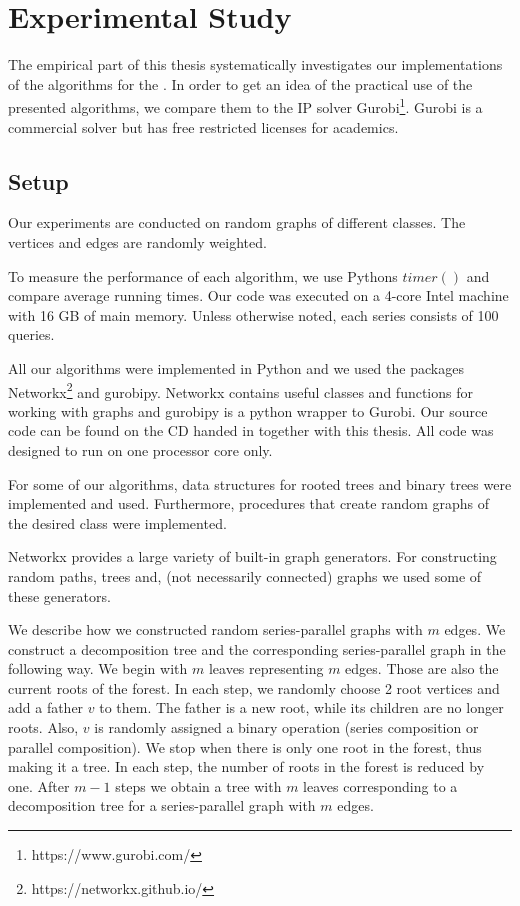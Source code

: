 \section{Experimental Study}
\label{sec:study}

The empirical part of this thesis systematically investigates our implementations of the algorithms for the \WSP. In order to get an idea of the practical use of the presented algorithms, we compare them to the IP solver Gurobi\footnote{https://www.gurobi.com/}. Gurobi is a commercial solver but has free restricted licenses for academics.


\subsection{Setup}
\label{sec:study:setup}

Our experiments are conducted on random graphs of different classes. The vertices and edges are randomly weighted.\medskip

To measure the performance of each algorithm, we use Pythons $timer()$ and compare average running times. Our code was executed on a 4-core Intel machine with 16 GB of main memory. Unless otherwise noted, each series consists of 100 queries.\medskip

All our algorithms were implemented in Python and we used the packages Networkx\footnote{https://networkx.github.io/} and gurobipy. Networkx contains useful classes and functions for working with graphs and gurobipy is a python wrapper to Gurobi. Our source code can be found on the CD handed in together with this thesis. All code was designed to run on one processor core only.\medskip

For some of our algorithms, data structures for rooted trees and binary trees were implemented and used. Furthermore, procedures that create random graphs of the desired class were implemented.\medskip

Networkx provides a large variety of built-in graph generators. For constructing random paths, trees and, (not necessarily connected) graphs we used some of these generators.\medskip

We describe how we constructed random series-parallel graphs with $m$ edges. We construct a decomposition tree and the corresponding series-parallel graph in the following way. We begin with $m$ leaves representing $m$ edges. Those are also the current roots of the forest. In each step, we randomly choose 2 root vertices and add a father $v$ to them. The father is a new root, while its children are no longer roots. Also, $v$ is randomly assigned a binary operation (series composition or parallel composition). We stop when there is only one root in the forest, thus making it a tree. In each step, the number of roots in the forest is reduced by one. After $m - 1$ steps we obtain a tree with $m$ leaves corresponding to a decomposition tree for a series-parallel graph with $m$ edges.\medskip

